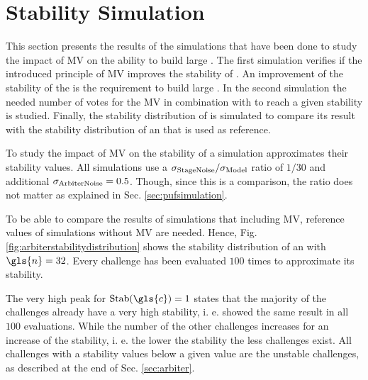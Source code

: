 \chapter{Stability Simulation}
\label{cap:stabilitysimulation}

This section presents the results of the simulations that have been done to study the impact of \ac{MV} on the ability to build large \mxpufs.
The first simulation verifies if the introduced principle of \ac{MV} improves the stability of \apuf.
An improvement of the stability of the \apufs is the requirement to build large \xpufs.
In the second simulation the needed number of votes for the \ac{MV} in combination with \xpufs to reach a given stability is studied.
Finally, the stability distribution of \mxpufs is simulated to compare its result with the stability distribution of an \apuf that is used as reference.

To study the impact of \ac{MV} on the stability of \pufs a simulation approximates their stability values.
All simulations use a $\sigma_{\mathrm{Stage Noise}}/\sigma_{\mathrm{Model}}$ ratio of $1/30$ and additional $\sigma_{\mathrm{Arbiter Noise}} = 0.5$.
Though, since this is a comparison, the ratio does not matter as explained in Sec. \ref{sec:pufsimulation}.

To be able to compare the results of simulations that including \ac{MV}, reference values of \apufs simulations without \ac{MV} are needed.
Hence, Fig. \ref{fig:arbiterstabilitydistribution} shows the stability distribution of an \apuf with $\gls{n} = 32$.
Every challenge has been evaluated $100$ times to approximate its stability.

The very high peak for $\Stab(\gls{c}) = 1$ states that the majority of the challenges already have a very high stability, i. e. showed the same result in all $100$ evaluations.
While the number of the other challenges increases for an increase of the stability, i. e. the lower the stability the less challenges exist.
All challenges with a stability values below a given value are the unstable challenges, as described at the end of Sec. \ref{sec:arbiter}.

